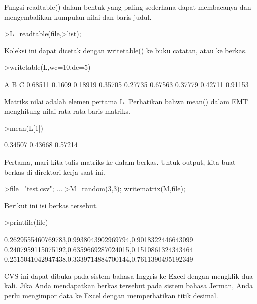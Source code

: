 \documentclass[a4paper,10pt]{article}
\begin{document}
\begin{eulernotebook}
\begin{euleroutput}
\end{euleroutput}
\begin{eulercomment}
Fungsi readtable() dalam bentuk yang paling sederhana dapat membacanya
dan mengembalikan kumpulan nilai dan baris judul.
\end{eulercomment}
\begin{eulerprompt}
>L=readtable(file,>list);
\end{eulerprompt}
\begin{eulercomment}
Koleksi ini dapat dicetak dengan writetable() ke buku catatan, atau ke
berkas.
\end{eulercomment}
\begin{eulerprompt}
>writetable(L,wc=10,dc=5)
\end{eulerprompt}
\begin{euleroutput}
           A         B         C
     0.68511    0.1609   0.18919
     0.35705   0.27735   0.67563
     0.37779   0.42711   0.91153
\end{euleroutput}
\begin{eulercomment}
Matriks nilai adalah elemen pertama L. Perhatikan bahwa mean() dalam
EMT menghitung nilai rata-rata baris matriks.
\end{eulercomment}
\begin{eulerprompt}
>mean(L[1])
\end{eulerprompt}
\begin{euleroutput}
    0.34507 
    0.43668 
    0.57214 
\end{euleroutput}
\begin{eulercomment}
Pertama, mari kita tulis matriks ke dalam berkas. Untuk output, kita
buat berkas di direktori kerja saat ini.
\end{eulercomment}
\begin{eulerprompt}
>file="test.csv";  ...
>M=random(3,3); writematrix(M,file);
\end{eulerprompt}
\begin{eulercomment}
Berikut ini isi berkas tersebut.
\end{eulercomment}
\begin{eulerprompt}
>printfile(file)
\end{eulerprompt}
\begin{euleroutput}
  0.2629555460769783,0.9938043902969794,0.9018322446643099
  0.2407959115075192,0.6359669287024015,0.1510861324343464
  0.2515041042947438,0.3339714884700144,0.7611390495192349
  
\end{euleroutput}
\begin{eulercomment}
CVS ini dapat dibuka pada sistem bahasa Inggris ke Excel dengan
mengklik dua kali. Jika Anda mendapatkan berkas tersebut pada sistem
bahasa Jerman, Anda perlu mengimpor data ke Excel dengan memperhatikan
titik desimal.


\end{eulercomment}
\end{eulernotebook}
\end{document}
